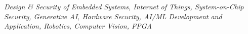 
\begin{rSection}
    \textit{ Design \& Security of Embedded Systems, Internet of Things, System-on-Chip Security,  Generative AI, Hardware Security, AI/ML Development and Application, Robotics, Computer Vision, FPGA}
\end{rSection}